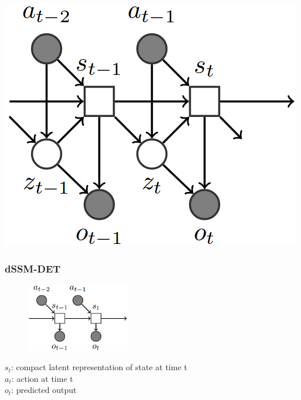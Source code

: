 \begin{frame}
\begin{multicols}{3}
		\includegraphics[width=\columnwidth]{./latent_i2a_images/sSSM_architecture.png}
	\end{multicols}
\end{frame}

\begin{frame}
	\frametitle{dSSM-DET}
	\begin{multicols}{2}
		\begin{figure}[h]
			\includegraphics[width=0.4\textwidth]{./latent_i2a_images/dSSM_DET_architecture.png}	
		\end{figure}
		\columnbreak
		$s_t$: compact latent representation of state at time t\\
		$a_t$: action at time t\\
		$o_t$: predicted output
	\end{multicols}
\end{frame}

